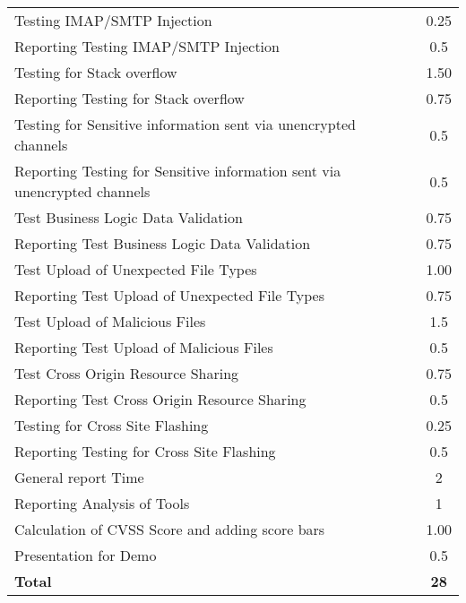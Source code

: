 \begin{table}[H]
\begin{tabular*}{\textwidth}{@{\extracolsep{\fill}} l c@{\extracolsep{0pt}} }
Testing IMAP/SMTP Injection                 & 0.25 \\
Reporting Testing IMAP/SMTP Injection       & 0.5 \\
Testing for Stack overflow                  & 1.50 \\
Reporting Testing for Stack overflow        & 0.75 \\
Testing for Sensitive information sent via unencrypted channels & 0.5 \\
Reporting Testing for Sensitive information sent via unencrypted channels & 0.5 \\
Test Business Logic Data Validation         & 0.75 \\
Reporting Test Business Logic Data Validation & 0.75 \\
Test Upload of Unexpected File Types        & 1.00 \\
Reporting Test Upload of Unexpected File Types & 0.75 \\
Test Upload of Malicious Files              & 1.5 \\
Reporting Test Upload of Malicious Files    & 0.5 \\
Test Cross Origin Resource Sharing          & 0.75 \\
Reporting Test Cross Origin Resource Sharing & 0.5 \\
Testing for Cross Site Flashing             & 0.25 \\
Reporting Testing for Cross Site Flashing   & 0.5 \\
General report Time							& 2 \\
Reporting Analysis of Tools                 & 1 \\
Calculation of CVSS Score and adding score bars	& 1.00 \\
Presentation for Demo						& 0.5 \\ \hline\hline
\textbf{Total}								& \textbf{28}
\end{tabular*}
\end{table}


